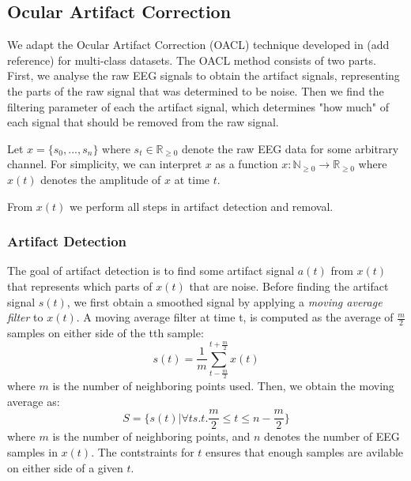 \subsection{Ocular Artifact Correction}
We adapt the  Ocular Artifact Correction (OACL) technique developed in (add reference) for multi-class datasets. The OACL method consists of two parts. First, we analyse the raw EEG signals to obtain the artifact signals, representing the parts of the raw signal that was determined to be noise. Then we find the filtering parameter of each the artifact signal, which determines "how much" of each signal that should be removed from the raw signal. 

Let $x = \{s_0, ...,s_n\}$ where $s_t \in \mathbb{R}_{\geq 0}$ denote the raw EEG data for some arbitrary channel. For simplicity, we can interpret $x$ as a function $x : \mathbb{N}_{\geq 0} \rightarrow \mathbb{R}_{\geq 0}$ where $x(t)$ denotes the amplitude of $x$ at time $t$. 

From $x(t)$ we perform all steps in artifact detection and removal.


\subsubsection{Artifact Detection}
The goal of artifact detection is to find some artifact signal $a(t)$ from $x(t)$ that represents which parts of $x(t)$ that are noise. Before finding the artifact signal $s(t)$, we first obtain a smoothed signal by applying a \emph{moving average filter} to $x(t)$. A moving average filter at time t, is computed as the average of $\frac{m}{2}$ samples on either side of the tth sample:
\begin{equation}
\label{eq:movavg}
s(t) = \frac{1}{m}\sum_{t-\frac{m}{2}}^{t+\frac{m}{2}}x(t)
\end{equation}
where $m$ is the number of neighboring points used. Then, we obtain the moving average as:
\begin{equation}
\label{eq:setmovavg}
S = \{s(t) | \forall t s.t. \frac{m}{2} \leq t \leq n-\frac{m}{2} \}
\end{equation}
where $m$ is the number of neighboring points, and $n$ denotes the number of EEG samples in $x(t)$. The contstraints for $t$ ensures that enough samples are avilable on either side of a given $t$. 

